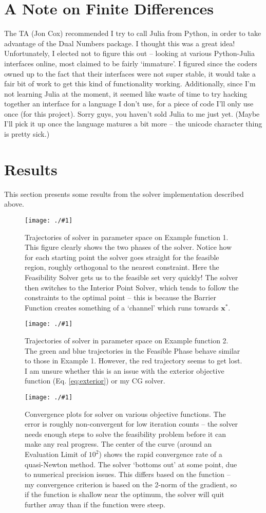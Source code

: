\documentclass{article}
\newcommand{\img}[2]{
	\begin{figure}[H]
	\centering%
	\texttt{[image: ./\#1]}
	\caption{#2}     %
	\label{fig:#1}   %
	\end{figure} }
\newcommand{\bs}[1]{\boldsymbol{#1}}
\begin{document}
\section{A Note on Finite Differences}

The TA (Jon Cox) recommended I try to call Julia from Python, in order to take advantage of the Dual Numbers package. I thought this was a great idea! Unfortunately, I elected not to figure this out -- looking at various Python-Julia interfaces online, most claimed to be fairly `immature'. I figured since the coders owned up to the fact that their interfaces were not super stable, it would take a fair bit of work to get this kind of functionality working. Additionally, since I'm not learning Julia at the moment, it seemed like waste of time to try hacking together an interface for a language I don't use, for a piece of code I'll only use once (for this project). Sorry guys, you haven't sold Julia to me just yet. (Maybe I'll pick it up once the language matures a bit more -- the unicode character thing is pretty sick.)

\section{Results}
This section presents some results from the solver implementation described above.

\img{trajectories_1}{Trajectories of solver in parameter space on Example function 1. This figure clearly shows the two phases of the solver. Notice how for each starting point the solver goes straight for the feasible region, roughly orthogonal to the nearest constraint. Here the Feasibility Solver gets us to the feasible set very quickly! The solver then switches to the Interior Point Solver, which tends to follow the constraints to the optimal point -- this is because the Barrier Function creates something of a `channel' which runs towards $\bs{x}^*$.}

\img{trajectories_2}{Trajectories of solver in parameter space on Example function 2. The green and blue trajectories in the Feasible Phase behave similar to those in Example 1. However, the red trajectory seems to get lost. I am unsure whether this is an issue with the exterior objective function (Eq. \ref{eq:exterior}) or my CG solver.}

\img{convergence}{Convergence plots for solver on various objective functions. The error is roughly non-convergent for low iteration counts -- the solver needs enough steps to solve the feasibility problem before it can make any real progress. The center of the curve (around an Evaluation Limit of $10^2$) shows the rapid convergence rate of a quasi-Newton method. The solver `bottoms out' at some point, due to numerical precision issues. This differs based on the function -- my convergence criterion is based on the 2-norm of the gradient, so if the function is shallow near the optimum, the solver will quit further away than if the function were steep.}
\end{document}
